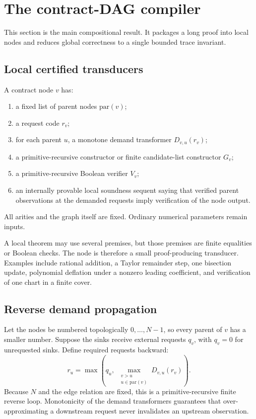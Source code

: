 \section{The contract-DAG compiler}

This section is the main compositional result.  It packages a long proof into
local nodes and reduces global correctness to a single bounded trace
invariant.

\subsection{Local certified transducers}

\begin{definition}
A contract node \(v\) has:
\begin{enumerate}[label=(\alph*)]
\item a fixed list of parent nodes \(\mathrm{par}(v)\);
\item a request code \(r_v\);
\item for each parent \(u\), a monotone demand transformer
      \(D_{v,u}(r_v)\);
\item a primitive-recursive constructor or finite candidate-list constructor
      \(G_v\);
\item a primitive-recursive Boolean verifier \(V_v\);
\item an internally provable local soundness sequent saying that verified
      parent observations at the demanded requests imply verification of the
      node output.
\end{enumerate}
All arities and the graph itself are fixed.  Ordinary numerical parameters
remain inputs.
\end{definition}

A local theorem may use several premises, but those premises are finite
equalities or Boolean checks.  The node is therefore a small proof-producing
transducer.  Examples include rational addition, a Taylor remainder step, one
bisection update, polynomial deflation under a nonzero leading coefficient,
and verification of one chart in a finite cover.

\subsection{Reverse demand propagation}

Let the nodes be numbered topologically \(0,\ldots,N-1\), so every parent of
\(v\) has a smaller number.  Suppose the sinks receive external requests
\(q_v\), with \(q_v=0\) for unrequested sinks.  Define required requests
backward:
\[
  r_u =
  \max\left(
       q_u,\;
       \max_{\substack{v>u\\u\in\mathrm{par}(v)}}
       D_{v,u}(r_v)
      \right).
\]
Because \(N\) and the edge relation are fixed, this is a primitive-recursive
finite reverse loop.  Monotonicity of the demand transformers guarantees that
over-approximating a downstream request never invalidates an upstream
observation.

